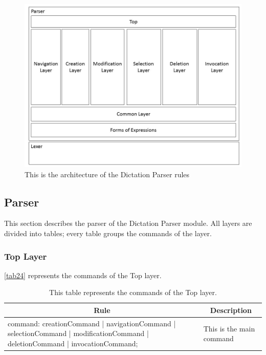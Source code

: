 \begin{figure}[H]
	\centering
	\includegraphics[scale=0.4]{./fig/BNFDiagram}
	\caption{This is the architecture of the Dictation Parser rules}
	\label{fig21}
\end{figure}

\subsection{Parser}
This section describes the parser of the Dictation Parser module. All layers are divided into tables; every table groups the commands of the layer.

\subsubsection{Top Layer}
\autoref{tab24} represents the commands of the Top layer.
\begin{table}[H]
	\centering
	\begin{tabular}{|p{8cm}|p{7cm}|}
		\hline
		\multicolumn{1}{|c|}{{\bf Rule}}                                                                                             & \multicolumn{1}{c|}{{\bf Description}} \\ \hline
		command: creationCommand | navigationCommand | selectionCommand | modificationCommand | deletionCommand | invocationCommand; & This is the main command               \\ \hline
	\end{tabular}
	\caption{This table represents the commands of the Top layer.}
	\label{tab24}
\end{table}

